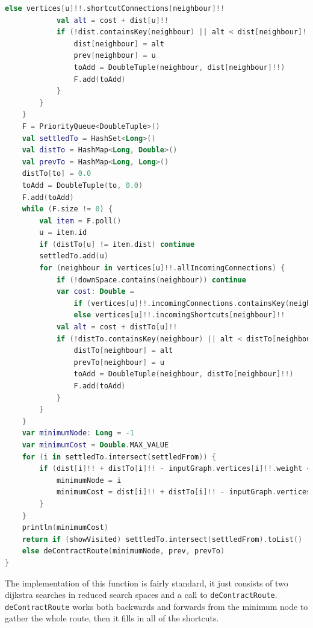 \documentclass[11pt,twoside,a4paper]{report}
\begin{document}
\begin{lstlisting}[language=kotlin]
                else vertices[u]!!.shortcutConnections[neighbour]!!
            val alt = cost + dist[u]!!
            if (!dist.containsKey(neighbour) || alt < dist[neighbour]!!) {
                dist[neighbour] = alt
                prev[neighbour] = u
                toAdd = DoubleTuple(neighbour, dist[neighbour]!!)
                F.add(toAdd)
            }
        }
    }
    F = PriorityQueue<DoubleTuple>()
    val settledTo = HashSet<Long>()
    val distTo = HashMap<Long, Double>()
    val prevTo = HashMap<Long, Long>()
    distTo[to] = 0.0
    toAdd = DoubleTuple(to, 0.0)
    F.add(toAdd)
    while (F.size != 0) {
        val item = F.poll()
        u = item.id
        if (distTo[u] != item.dist) continue
        settledTo.add(u)
        for (neighbour in vertices[u]!!.allIncomingConnections) {
            if (!downSpace.contains(neighbour)) continue
            var cost: Double =
                if (vertices[u]!!.incomingConnections.containsKey(neighbour)) vertices[u]!!.incomingConnections[neighbour]!!
                else vertices[u]!!.incomingShortcuts[neighbour]!!
            val alt = cost + distTo[u]!!
            if (!distTo.containsKey(neighbour) || alt < distTo[neighbour]!!) {
                distTo[neighbour] = alt
                prevTo[neighbour] = u
                toAdd = DoubleTuple(neighbour, distTo[neighbour]!!)
                F.add(toAdd)
            }
        }
    }
    var minimumNode: Long = -1
    var minimumCost = Double.MAX_VALUE
    for (i in settledTo.intersect(settledFrom)) {
        if (dist[i]!! + distTo[i]!! - inputGraph.vertices[i]!!.weight < minimumCost) {
            minimumNode = i
            minimumCost = dist[i]!! + distTo[i]!! - inputGraph.vertices[i]!!.weight
        }
    }
    println(minimumCost)
    return if (showVisited) settledTo.intersect(settledFrom).toList()
    else deContractRoute(minimumNode, prev, prevTo)
}
\end{lstlisting}
The implementation of this function is fairly standard, it just consists of two dijkstra searches in reduced search spaces and a call to \texttt{deContractRoute}. \texttt{deContractRoute} works both backwards and forwards from the minimum node to gather the whole route, then it fills in all of the shortcuts.
\end{document}
